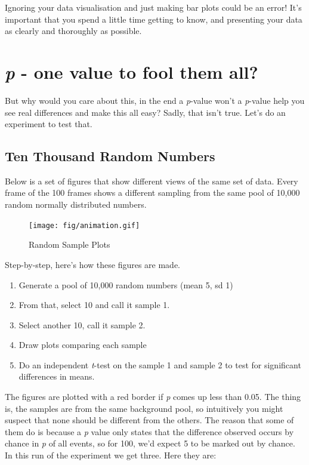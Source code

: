\documentclass[
]{book}
\providecommand{\tightlist}{%
  \setlength{\itemsep}{0pt}\setlength{\parskip}{0pt}}
\begin{document}
Ignoring your data visualisation and just making bar plots could be an error! It's important that you spend a little time getting to know, and presenting your data as clearly and thoroughly as possible.

\hypertarget{p---one-value-to-fool-them-all}{%
\section{\texorpdfstring{\emph{p} - one value to fool them all?}{p - one value to fool them all?}}\label{p---one-value-to-fool-them-all}}

But why would you care about this, in the end a \emph{p}-value won't a \emph{p}-value help you see real differences and make this all easy? Sadly, that isn't true. Let's do an experiment to test that.

\hypertarget{ten-thousand-random-numbers}{%
\subsection{Ten Thousand Random Numbers}\label{ten-thousand-random-numbers}}

Below is a set of figures that show different views of the same set of data. Every frame of the 100 frames shows a different sampling from the same pool of 10,000 random normally distributed numbers.

\begin{figure}
\centering
\texttt{[image: fig/animation.gif]}
\caption{Random Sample Plots}
\end{figure}

Step-by-step, here's how these figures are made.

\begin{enumerate}
\def\labelenumi{\arabic{enumi}.}
\tightlist
\item
  Generate a pool of 10,000 random numbers (mean 5, sd 1)
\item
  From that, select 10 and call it sample 1.
\item
  Select another 10, call it sample 2.
\item
  Draw plots comparing each sample
\item
  Do an independent \emph{t}-test on the sample 1 and sample 2 to test for significant differences in means.
\end{enumerate}

The figures are plotted with a red border if \emph{p} comes up less than 0.05. The thing is, the samples are from the same background pool, so intuitively you might suspect that none should be different from the others. The reason that some of them do is because a \emph{p} value only states that the difference observed occurs by chance in \emph{p} of all events, so for 100, we'd expect 5 to be marked out by chance. In this run of the experiment we get three. Here they are:
\end{document}

